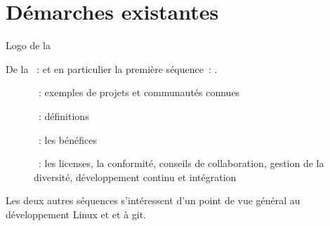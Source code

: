 \chapter{Démarches existantes}

\begin{marginfigure}
    \href{https://www.linuxfoundation.org/}{}
    \caption{Logo de la }
\end{marginfigure}

De la  :
  \href{https://www.edx.org/professional-certificate/linuxfoundationx-open-source-software-development-linux-and-git}
  {}
et en particulier la première séquence :
  \href{https://www.edx.org/course/open-source-software-development-linux-for-developers}
  {}.

\begin{description}
    \item[] : exemples de projets et communautés connues
    \item[] : définitions
    \item[] : les bénéfices
    \item[] : les licenses, la conformité, conseils de collaboration, gestion de la
        diversité, développement continu et intégration
\end{description}

Les deux autres séquences s'intéressent d'un point de vue général au développement Linux et et à git.
